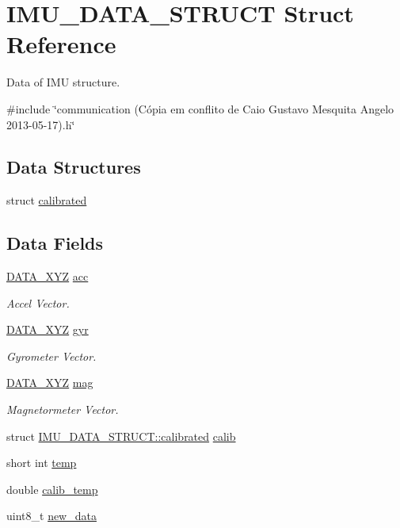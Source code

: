 \hypertarget{structIMU__DATA__STRUCT}{\section{I\-M\-U\-\_\-\-D\-A\-T\-A\-\_\-\-S\-T\-R\-U\-C\-T Struct Reference}
\label{structIMU__DATA__STRUCT}
}


Data of I\-M\-U structure.  




{\ttfamily \#include \char`\"{}communication (\-Cópia em conflito de Caio Gustavo Mesquita Angelo 2013-\/05-\/17).\-h\char`\"{}}

\subsection*{Data Structures}
\begin{DoxyCompactItemize}
\item 
struct \hyperlink{structIMU__DATA__STRUCT_1_1calibrated}{calibrated}
\end{DoxyCompactItemize}
\subsection*{Data Fields}
\begin{DoxyCompactItemize}
\item 
\hyperlink{structDATA__XYZ}{D\-A\-T\-A\-\_\-\-X\-Y\-Z} \hyperlink{structIMU__DATA__STRUCT_a448f284bf44eb503affda586ad5fa9d2}{acc}
\begin{DoxyCompactList}\small\item\em Accel Vector. \end{DoxyCompactList}\item 
\hyperlink{structDATA__XYZ}{D\-A\-T\-A\-\_\-\-X\-Y\-Z} \hyperlink{structIMU__DATA__STRUCT_a0c1ac26626e4434a2ee124a1928a23a1}{gyr}
\begin{DoxyCompactList}\small\item\em Gyrometer Vector. \end{DoxyCompactList}\item 
\hyperlink{structDATA__XYZ}{D\-A\-T\-A\-\_\-\-X\-Y\-Z} \hyperlink{structIMU__DATA__STRUCT_a40c7df8b6d49297aa52873cfd9b60daa}{mag}
\begin{DoxyCompactList}\small\item\em Magnetormeter Vector. \end{DoxyCompactList}\item 
struct \hyperlink{structIMU__DATA__STRUCT_1_1calibrated}{I\-M\-U\-\_\-\-D\-A\-T\-A\-\_\-\-S\-T\-R\-U\-C\-T\-::calibrated} \hyperlink{structIMU__DATA__STRUCT_aeffe3c3c5a7191a5cef16e7aab6c3795}{calib}
\item 
short int \hyperlink{structIMU__DATA__STRUCT_a81e1dbf765c1d947ca6076aa1bbc73e7}{temp}
\item 
double \hyperlink{structIMU__DATA__STRUCT_a3553fcee6beba17fe0c7711ac0483875}{calib\-\_\-temp}
\item 
uint8\-\_\-t \hyperlink{structIMU__DATA__STRUCT_a99924252176326418863e511d4fa437b}{new\-\_\-data}
\end{DoxyCompactItemize}


